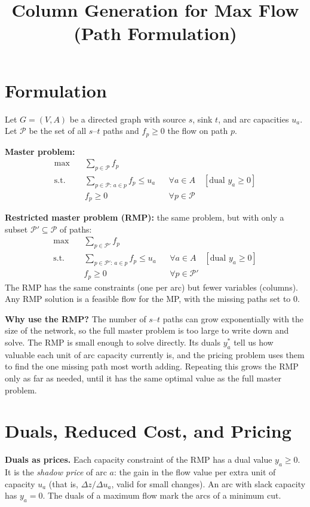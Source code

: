 \documentclass[11pt]{article}
\title{Column Generation for Max Flow (Path Formulation)}
\author{}
\date{}
\begin{document}
\maketitle

\section{Formulation}
Let $G=(V,A)$ be a directed graph with source $s$, sink $t$, and arc capacities $u_a$. Let $\mathcal{P}$ be the set of all $s$--$t$ paths and $f_p\ge 0$ the flow on path $p$.

\textbf{Master problem:}
\begin{align*}
\max\quad & \sum_{p\in\mathcal{P}} f_p\\
\text{s.t.}\quad & \sum_{p\in\mathcal{P}:\,a\in p} f_p \le u_a && \forall a\in A \quad [\text{dual } y_a\ge 0]\\
& f_p\ge 0 && \forall p\in\mathcal{P}
\end{align*}

\textbf{Restricted master problem (RMP):} the same problem, but with only a subset $\mathcal{P}'\subseteq\mathcal{P}$ of paths:
\begin{align*}
\max\quad & \sum_{p\in\mathcal{P}'} f_p\\
\text{s.t.}\quad & \sum_{p\in\mathcal{P}':\,a\in p} f_p \le u_a && \forall a\in A \quad [\text{dual } y_a\ge 0]\\
& f_p\ge 0 && \forall p\in\mathcal{P}'
\end{align*}
The RMP has the same constraints (one per arc) but fewer variables (columns). Any RMP solution is a feasible flow for the MP, with the missing paths set to $0$.

\textbf{Why use the RMP?} The number of $s$--$t$ paths can grow exponentially with the size of the network, so the full master problem is too large to write down and solve. The RMP is small enough to solve directly. Its duals $y_a^*$ tell us how valuable each unit of arc capacity currently is, and the pricing problem uses them to find the one missing path most worth adding. Repeating this grows the RMP only as far as needed, until it has the same optimal value as the full master problem.

\section{Duals, Reduced Cost, and Pricing}
\textbf{Duals as prices.} Each capacity constraint of the RMP has a dual value $y_a\ge 0$. It is the \emph{shadow price} of arc $a$: the gain in the flow value per extra unit of capacity $u_a$ (that is, $\Delta z/\Delta u_a$, valid for small changes). An arc with slack capacity has $y_a=0$. The duals of a maximum flow mark the arcs of a minimum cut.
\end{document}
